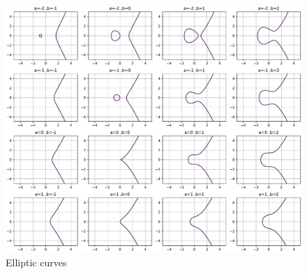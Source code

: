 \begin{figure}[!ht]
    \centering
    \includegraphics[width=1\linewidth]{./figure/elliptic_curves.pdf}
    \caption{Elliptic curves}
\end{figure}